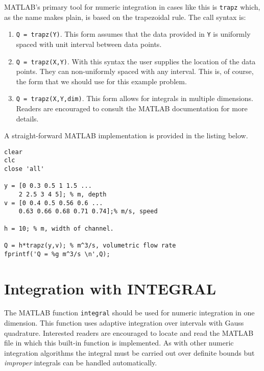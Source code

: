 \noindent MATLAB's primary tool for numeric integration in cases like this is \lstinline[style=myMatlab]{trapz} which, as the name makes plain, is based on the trapezoidal rule.  The call syntax is:
\begin{enumerate}
\item \lstinline[style=myMatlab]{Q = trapz(Y)}.  This form assumes that the data provided in \lstinline[style=myMatlab]{Y} is uniformly spaced with unit interval between data points.  
\item \lstinline[style=myMatlab]{Q = trapz(X,Y)}.  With this syntax the user supplies the location of the data points.  They can non-uniformly spaced with any interval.  This is, of course, the form that we should use for this example problem.

\item \lstinline[style=myMatlab]{Q = trapz(X,Y,dim)}. This form allows for integrals in multiple dimensions.  Readers are encouraged to consult the MATLAB documentation for more details.  
\end{enumerate}

A straight-forward MATLAB implementation is provided in the listing below.
\begin{lstlisting}[style=myMatlab,name=lec22n-ex1]
clear
clc
close 'all'

y = [0 0.3 0.5 1 1.5 ...
    2 2.5 3 4 5]; % m, depth
v = [0 0.4 0.5 0.56 0.6 ...
    0.63 0.66 0.68 0.71 0.74];% m/s, speed

h = 10; % m, width of channel.

Q = h*trapz(y,v); % m^3/s, volumetric flow rate
fprintf('Q = %g m^3/s \n',Q);
\end{lstlisting}

\section{Integration with INTEGRAL}
The MATLAB function \lstinline[style=myMatlab]{integral} should be used for numeric integration in one dimension. This function uses adaptive integration over intervals with Gauss quadrature.\cite{shampine2008vectorized}  Interested readers are encouraged to locate and read the MATLAB file in which this built-in function is implemented. As with other numeric integration algorithms the integral must be carried out over definite bounds but \emph{improper} integrals can be handled automatically.

